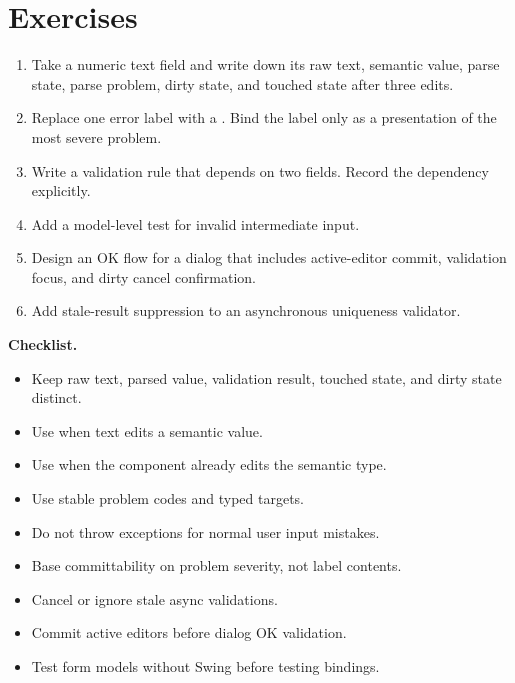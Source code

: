 \section{Exercises}

\begin{exercisebox}
\begin{enumerate}
\item Take a numeric text field and write down its raw text, semantic value,
parse state, parse problem, dirty state, and touched state after three edits.
\item Replace one error label with a . Bind the label only as a
presentation of the most severe problem.
\item Write a validation rule that depends on two fields. Record the dependency
explicitly.
\item Add a model-level test for invalid intermediate input.
\item Design an OK flow for a dialog that includes active-editor commit,
validation focus, and dirty cancel confirmation.
\item Add stale-result suppression to an asynchronous uniqueness validator.
\end{enumerate}
\end{exercisebox}

\textbf{Checklist.}

\begin{itemize}
\item Keep raw text, parsed value, validation result, touched state, and dirty
state distinct.
\item Use  when text edits a semantic value.
\item Use  when the component already edits the semantic type.
\item Use stable problem codes and typed targets.
\item Do not throw exceptions for normal user input mistakes.
\item Base committability on problem severity, not label contents.
\item Cancel or ignore stale async validations.
\item Commit active editors before dialog OK validation.
\item Test form models without Swing before testing bindings.
\end{itemize}
